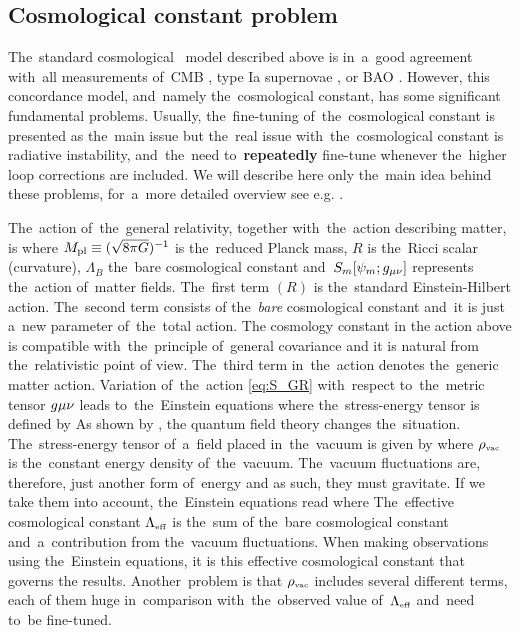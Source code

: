 \subsection{Cosmological constant problem}
\label{ssec:lambda}
The~standard cosmological \LCDM\ model described above is in~a~good agreement with~all measurements of~CMB \parencite{planck_cosm}, type Ia supernovae \parencite{Abbott_2019}, or BAO \parencite{BAO_results}. However, this concordance model, and~namely the~cosmological constant, has some significant fundamental problems. Usually, the~fine-tuning of~the~cosmological constant is presented as the~main issue but the~real issue with~the~cosmological constant is radiative instability, and~the~need to~\textbf{repeatedly} fine-tune whenever the~higher loop corrections are included. We will describe here only the~main idea behind these problems, for~a~more detailed overview see e.g. \textcite{2015arXiv150205296P,2012CRPhy..13..566M}.

The~action of~the~general relativity, together with~the~action describing matter, is
where $M_{\text{\scriptsize pl}}\equiv(\sqrt{8\pi G})^{-1}$ is the~reduced Planck mass, $R$ is the~Ricci scalar (curvature), $\Lambda_B$ the~bare cosmological constant and~$S_m[\psi_m;g_{\mu\nu}]$ represents the~action of~matter fields. The~first term $(R)$ is the~standard Einstein-Hilbert action. The~second term consists of the~\textit{bare} cosmological constant and~it is just a~new parameter of~the~total action. The cosmology constant in the action above is compatible with~the~principle of~general covariance and it is natural from the~relativistic point of view. The~third term in~the~action denotes the~generic matter action. Variation of~the~action \eqref{eq:S_GR} with~respect to~the~metric tensor $g{\mu\nu}$ leads to~the~Einstein equations
where the~stress-energy tensor is defined by
As shown by \textcite{1968SPhD...12.1040S}, the quantum field theory changes the~situation. The~stress-energy tensor of~a~field placed in~the~vacuum is given by
where $\rho_\text{\tiny vac}$ is the~constant energy density of~the~vacuum. The~vacuum fluctuations are, therefore, just another form of~energy and as such, they must gravitate. If we take them into account,  the~Einstein equations read
where
The~effective cosmological constant $\Lambda_\text{\tiny eff}$ is the~sum of the~bare cosmological constant and~a~contribution from the~vacuum fluctuations. When making observations using the~Einstein equations, it is this effective cosmological constant that governs the results. Another~problem is that $\rho_\text{\tiny vac}$ includes several different terms, each of them huge in~comparison with~the~observed value of~$\Lambda_\text{\tiny eff}$ and~need to~be fine-tuned.
